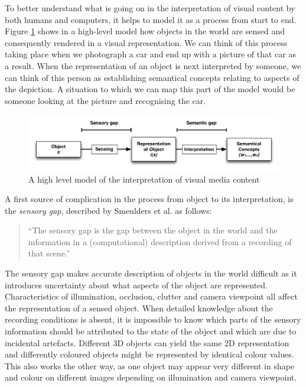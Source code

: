 To better understand what is going on in the interpretation of visual content by both humans and computers, it helps to model it as a process from start to end. Figure \ref{fig:understanding_visuals} shows in a high-level model how objects in the world are sensed and consequently rendered in a visual representation. We can think of this process taking place when we photograph a car and end up with a picture of that car as a result. When the representation of an object is next interpreted by someone, we can think of this person as establishing semantical concepts relating to aspects of the depiction. A situation to which we can map this part of the model would be someone looking at the picture and recognising the car.

\begin{figure}[htbp]
  \centering
    \includegraphics[width=.8\textwidth]{img/understanding_visuals}
  \caption{A high level model of the interpretation of visual media content}
  \label{fig:understanding_visuals}
\end{figure}

A first source of complication in the process from object to its interpretation, is the \emph{sensory gap}, described by Smeulders et al. as follows:

\begin{quote}
  ``The sensory gap is the gap between the object in the world and the information in a (computational) description derived from a recording of that scene.''\cite{Smeulders:2000tx}
\end{quote}

The sensory gap makes accurate description of objects in the world difficult as it introduces uncertainty about what aspects of the object are represented. Characteristics of illumination, occlusion, clutter and camera viewpoint all affect the representation of a sensed object. When detailed knowledge about the recording conditions is absent, it is impossible to know which parts of the sensory information should be attributed to the state of the object and which are due to incidental artefacts. Different 3D objects can yield the same 2D representation and differently coloured objects might be represented by identical colour values. This also works the other way, as one object may appear very different in shape and colour on different images depending on illumination and camera viewpoint.


